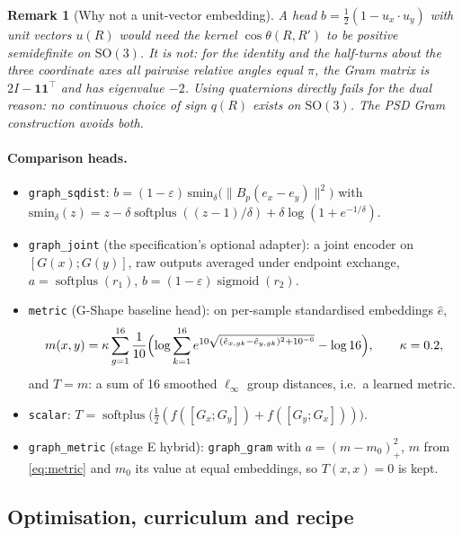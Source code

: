 \documentclass[11pt]{article}
\newtheorem{remark}{Remark}
\newcommand{\SO}{\mathrm{SO}(3)}
\newcommand{\code}[1]{\texttt{#1}}
\begin{document}
\begin{remark}[Why not a unit-vector embedding]
A head $b=\frac12(1-u_x\cdot u_y)$ with unit vectors $u(R)$ would need the kernel $\cos\theta(R,R')$
to be positive semidefinite on $\SO$. It is not: for the identity and the half-turns about the three
coordinate axes all pairwise relative angles equal $\pi$, the Gram matrix is $2I-\mathbf 1\mathbf 1^\top$
and has eigenvalue $-2$. Using quaternions directly fails for the dual reason: no continuous choice
of sign $q(R)$ exists on $\SO$. The PSD Gram construction avoids both.
\end{remark}

\paragraph{Comparison heads.}
\begin{itemize}
\item \code{graph\_sqdist}: $b=(1-\varepsilon)\,\mathrm{smin}_\delta\bigl(\|B_p(e_x-e_y)\|^2\bigr)$ with
$\mathrm{smin}_\delta(z)=z-\delta\operatorname{softplus}((z-1)/\delta)+\delta\log(1+e^{-1/\delta})$.
\item \code{graph\_joint} (the specification's optional adapter): a joint encoder on $[G(x);G(y)]$,
raw outputs averaged under endpoint exchange, $a=\operatorname{softplus}(r_1)$,
$b=(1-\varepsilon)\operatorname{sigmoid}(r_2)$.
\item \code{metric} (G-Shape baseline head): on per-sample standardised embeddings $\hat e$,
\begin{equation}
m(x,y)=\kappa\sum_{g=1}^{16}\frac1{10}\Bigl(\log\sum_{k=1}^{16}e^{10\sqrt{(\hat e_{x,gk}-\hat e_{y,gk})^2+10^{-6}}}-\log16\Bigr),\qquad\kappa=0.2,
\label{eq:metric}
\end{equation}
and $T=m$: a sum of 16 smoothed $\ell_\infty$ group distances, i.e.\ a learned metric.
\item \code{scalar}: $T=\operatorname{softplus}\bigl(\tfrac12(f([G_x;G_y])+f([G_y;G_x]))\bigr)$.
\item \code{graph\_metric} (stage E hybrid): \code{graph\_gram} with $a=(m-m_0)_+^2$, $m$ from
\eqref{eq:metric} and $m_0$ its value at equal embeddings, so $T(x,x)=0$ is kept.
\end{itemize}

\subsection{Optimisation, curriculum and recipe}
\end{document}
